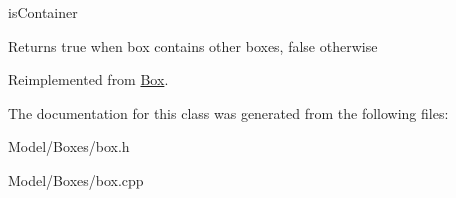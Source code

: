 is\-Container 

\begin{DoxyReturn}{Returns}
true when box contains other boxes, false otherwise 
\end{DoxyReturn}


Reimplemented from \hyperlink{class_box_aa836717b34b2a26f84b6933d143da42b}{Box}.



The documentation for this class was generated from the following files\-:\begin{DoxyCompactItemize}
\item 
Model/\-Boxes/box.\-h\item 
Model/\-Boxes/box.\-cpp\end{DoxyCompactItemize}
